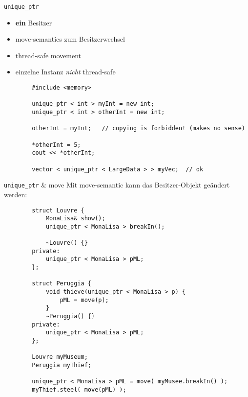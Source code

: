 \begin{frame}[fragile]{ \texttt{unique\_ptr} }
	\begin{itemize}
		\item \textbf{ein} Besitzer
		\item move-semantics zum Besitzerwechsel
		\item thread-safe movement
		\item einzelne Instanz \emph{nicht} thread-safe
	\end{itemize}
	
	\begin{lstlisting}
		#include <memory>
		
		unique_ptr < int > myInt = new int;
		unique_ptr < int > otherInt = new int;
		
		otherInt = myInt;	// copying is forbidden! (makes no sense)
		
		*otherInt = 5;
		cout << *otherInt;
		
		vector < unique_ptr < LargeData > > myVec;	// ok
	\end{lstlisting}
\end{frame}

\begin{frame}[fragile]{ \texttt{unique\_ptr} \& move }
	Mit move-semantic kann das Besitzer-Objekt geändert werden:
	
	\begin{lstlisting}
		struct Louvre {
			MonaLisa& show();
			unique_ptr < MonaLisa > breakIn();
			
			~Louvre() {}
		private:
			unique_ptr < MonaLisa > pML;
		};
		
		struct Peruggia {
			void thieve(unique_ptr < MonaLisa > p) {
				pML = move(p);
			}
			~Peruggia() {}
		private:
			unique_ptr < MonaLisa > pML;
		};
		
		Louvre myMuseum;
		Peruggia myThief;
		
		unique_ptr < MonaLisa > pML = move( myMusee.breakIn() );
		myThief.steel( move(pML) );
	\end{lstlisting}
\end{frame}

